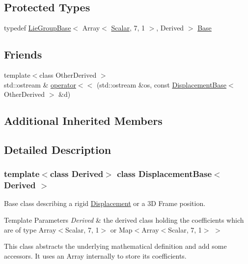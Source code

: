 \subsection*{Protected Types}
\begin{DoxyCompactItemize}
\item 
typedef \hyperlink{class_lie_group_base}{Lie\+Group\+Base}$<$ Array$<$ \hyperlink{class_displacement_base_a978caf313131fd9d221a856a2e4a80ad}{Scalar}, 7, 1 $>$, Derived $>$ \hyperlink{class_displacement_base_ae1eea29b955c12d84603ab1b81bfe3c4}{Base}
\end{DoxyCompactItemize}
\subsection*{Friends}
\begin{DoxyCompactItemize}
\item 
{\footnotesize template$<$class Other\+Derived $>$ }\\std\+::ostream \& \hyperlink{class_displacement_base_ae3b817959fb2c6e82221c44ff1f3c9d1}{operator$<$$<$} (std\+::ostream \&os, const \hyperlink{class_displacement_base}{Displacement\+Base}$<$ Other\+Derived $>$ \&d)
\end{DoxyCompactItemize}
\subsection*{Additional Inherited Members}


\subsection{Detailed Description}
\subsubsection*{template$<$class Derived$>$\newline
class Displacement\+Base$<$ Derived $>$}

Base class describing a rigid \hyperlink{class_displacement}{Displacement} or a 3D Frame position. 


\begin{DoxyTemplParams}{Template Parameters}
{\em Derived} & the derived class holding the coefficients which are of type Array$<$\+Scalar, 7, 1$>$ or Map$<$Array$<$\+Scalar, 7, 1$>$ $>$\\
\hline
\end{DoxyTemplParams}
This class abstracts the underlying mathematical definition and add some accessors. It uses an Array internally to store its coefficients. 

